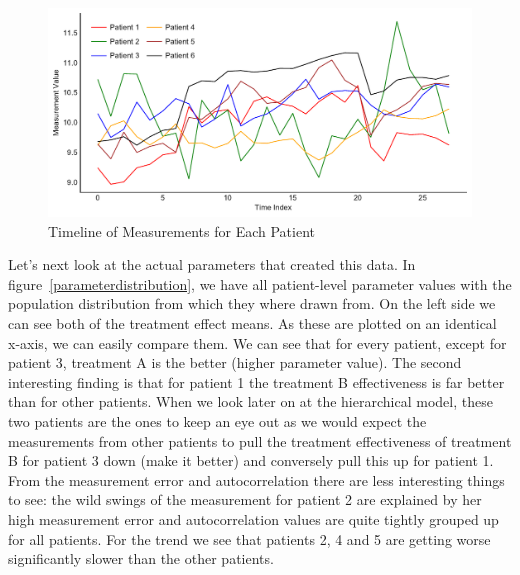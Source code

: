 \documentclass[12pt,a4paper,leqno]{report}
\theoremstyle{plain}
\theoremstyle{definition}
\theoremstyle{remark}
\begin{document}
\begin{figure}[H]
    \caption{Timeline of Measurements for Each Patient}\label{measurementtimeline}
    \bigskip
    \includegraphics[width=\textwidth,height=\textheight,keepaspectratio]{measurements_timeline.pdf}
\end{figure}

Let's next look at the actual parameters that created this data.
In figure\ \ref{parameterdistribution}, we have all patient-level parameter values with the population
distribution from which they where drawn from. On the left side we can see both of the
treatment effect means. As these are plotted on an identical x-axis, we can easily compare
them. We can see that for every patient, except for patient 3, treatment A is
the better (higher parameter value). The second interesting finding is that for patient
1 the treatment B effectiveness is far better than for other patients. When we look later on at
the hierarchical model, these two patients are the ones to keep an eye out as we would
expect the measurements from other patients to pull the treatment effectiveness of
treatment B for patient 3 down (make it better) and conversely pull this up for patient
1. From the measurement error and autocorrelation there are less interesting things to
see: the wild swings of the measurement for patient 2
are explained by her high measurement error and autocorrelation values are quite tightly
grouped up for all patients. For the trend we see that patients 2, 4 and 5 are getting
worse significantly slower than the other patients.
\end{document}
